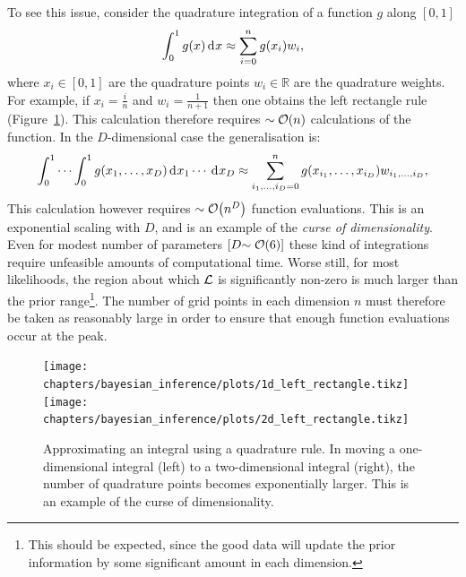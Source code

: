 To see this issue, consider the quadrature integration of a function \(g\) along \([0,1]\)
\begin{equation}
  \int_0^1 g(x) \operatorname{d}^{}\!{x} \approx \sum\limits_{i=0}^{n} g(x_i) w_i,
  \label{eqn:bay:quadrature_1d}
\end{equation}
where \({x_i\in[0,1]}\) are the quadrature points \({w_i\in\mathbb{R}}\) are the quadrature weights. For example, if \(x_i = \frac{i}{n}\) and \(w_i=\frac{1}{n+1}\) then one obtains the left rectangle rule (Figure~\ref{fig:bay:quadrature}). This calculation therefore requires \({\sim\mathcal{O}{\left(n\right)}}\) calculations of the function. In the \(D\)-dimensional case the generalisation is:
\begin{equation}
  \int_0^1\cdots\int_0^1 g(x_1,\ldots,x_D) \operatorname{d}^{}\!{x_1}\cdots \: \operatorname{d}^{}\!{x_D} \approx \sum\limits_{i_1,\ldots,i_D=0}^{n} g(x_{i_1},\ldots,x_{i_D}) w_{i_1,\ldots,i_D},
  \label{eqn:bay:quadrature_nd}
\end{equation}
This calculation however requires \({\sim\mathcal{O}{\left(n^D\right)}}\) function evaluations. This is an exponential scaling with \(D\), and is an example of the {\em curse of dimensionality}. Even for modest number of parameters \(\left[ D{\sim\mathcal{O}{\left(6\right)}} \right]\) these kind of integrations require unfeasible amounts of computational time. Worse still, for most likelihoods, the region about which \(\mathcal{L}\) is significantly non-zero is much larger than the prior range\footnote{This should be expected, since the good data will update the prior information by some significant amount in each dimension.}. The number of grid points in each dimension \(n\) must therefore be taken as reasonably large in order to ensure that enough function evaluations occur at the peak.

\begin{figure}[tp]
  \centering
    \texttt{[image: chapters/bayesian\_inference/plots/1d\_left\_rectangle.tikz]}
    \texttt{[image: chapters/bayesian\_inference/plots/2d\_left\_rectangle.tikz]}
  \caption{Approximating an integral using a quadrature rule. In moving a one-dimensional integral (left) to a two-dimensional integral (right), the number of quadrature points becomes exponentially larger. This is an example of the curse of dimensionality.}\label{fig:bay:quadrature}
\end{figure}

